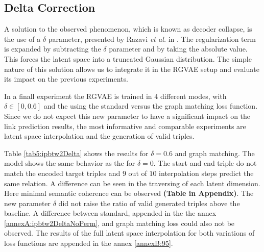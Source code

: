 \subsection{Delta Correction}
\label{ssec5:delta}

A solution to the observed phenomenon, which is known as decoder collapse, is the use of a $\delta$ parameter, presented by Razavi \textit{et al.} in \cite{razavi_preventing_2018}. The regularization term is expanded by subtracting the $\delta$ parameter and by taking the absolute value. This forces the latent space into a truncated Gaussian distribution. The simple nature of this solution allows us to integrate it in the RGVAE setup and evaluate its impact on the previous experiments.

In a finall experiment the RGVAE is trained in $4$ different modes, with $\delta \in [0, 0.6]$ and the using the standard versus the graph matching loss function. Since we do not expect this new parameter to have a significant impact on the link prediction results, the most informative and comparable experiments are latent space interpolation and the generation of valid triples.

Table \ref{tab5:ipbtw2Delta} shows the results for $\delta = 0.6$ and graph matching. The model shows the same behavior as the for $\delta = 0$. The start and end triple do not match the encoded target triples and $9$ out of $10$ interpolation steps predict the same relation. A difference can be seen in the traversing of each latent dimension. Here minimal semantic coherence can be observed \textbf{(Table in Appendix)}.
The new parameter $\delta$ did not raise the ratio of valid generated triples above the baseline.
A difference between standard, appended in the the annex \ref{annexA:ipbtw2DeltaNoPerm}, and graph matching loss could also not be observed. The results of the full latent space interpolation for both variations of loss functions are appended in the annex \ref{annexB:95}.


